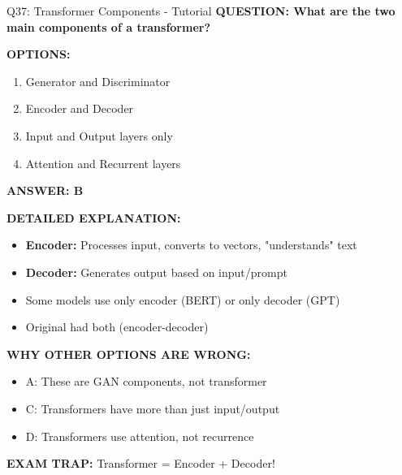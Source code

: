 \documentclass[8pt]{beamer}
\begin{document}
	\begin{frame}{Q37: Transformer Components - Tutorial}
		\fontsize{6.5}{7.5}\selectfont
		\textbf{QUESTION: What are the two main components of a transformer?}
		
		\vspace{0.1cm}
		\textbf{OPTIONS:}
		\begin{enumerate}
			\item Generator and Discriminator
			\item Encoder and Decoder
			\item Input and Output layers only
			\item Attention and Recurrent layers
		\end{enumerate}
		
		\vspace{0.1cm}
		\textcolor{myblue}{\textbf{ANSWER: B}}
		
		\vspace{0.1cm}
		\textbf{DETAILED EXPLANATION:}
		\begin{itemize}
			\item \textbf{Encoder:} Processes input, converts to vectors, "understands" text
			\item \textbf{Decoder:} Generates output based on input/prompt
			\item Some models use only encoder (BERT) or only decoder (GPT)
			\item Original had both (encoder-decoder)
		\end{itemize}
		
		\vspace{0.1cm}
		\textcolor{myred}{\textbf{WHY OTHER OPTIONS ARE WRONG:}}
		\begin{itemize}
			\item \textcolor{myred}{A:} These are GAN components, not transformer
			\item \textcolor{myred}{C:} Transformers have more than just input/output
			\item \textcolor{myred}{D:} Transformers use attention, not recurrence
		\end{itemize}
		
		\textcolor{myred}{\textbf{EXAM TRAP:}} Transformer = \textcolor{myblue}{Encoder + Decoder}!
	\end{frame}
	
\end{document}
